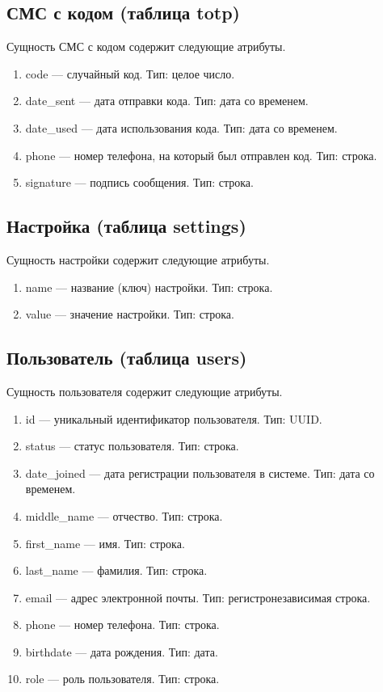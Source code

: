 \subsection*{СМС с кодом (таблица totp)}

Сущность СМС с кодом содержит следующие атрибуты.

\begin{enumerate}
	\item code --- случайный код. Тип: целое число.
	\item date\_sent --- дата отправки кода. Тип: дата со временем.
	\item date\_used --- дата использования кода. Тип: дата со временем.
	\item phone --- номер телефона, на который был отправлен код. Тип: строка.
	\item signature --- подпись сообщения. Тип: строка.
\end{enumerate}

\subsection*{Настройка (таблица settings)}

Сущность настройки содержит следующие атрибуты.

\begin{enumerate}
	\item name --- название (ключ) настройки. Тип: строка.
	\item value --- значение настройки. Тип: строка.
\end{enumerate}

\subsection*{Пользователь (таблица users)}

Сущность пользователя содержит следующие атрибуты.

\begin{enumerate}
	\item id --- уникальный идентификатор пользователя. Тип: UUID.
	\item status --- статус пользователя. Тип: строка.
	\item date\_joined --- дата регистрации пользователя в системе. Тип: дата со
	      временем.
	\item middle\_name --- отчество. Тип: строка.
	\item first\_name --- имя. Тип: строка.
	\item last\_name --- фамилия. Тип: строка.
	\item email --- адрес электронной почты. Тип: регистронезависимая строка.
	\item phone --- номер телефона. Тип: строка.
	\item birthdate --- дата рождения. Тип: дата.
	\item role --- роль пользователя. Тип: строка.
\end{enumerate}

